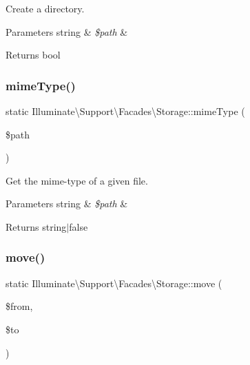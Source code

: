 Create a directory.


\begin{DoxyParams}[1]{Parameters}
string & {\em \$path} & \\
\hline
\end{DoxyParams}
\begin{DoxyReturn}{Returns}
bool 
\end{DoxyReturn}
\mbox{\label{class_illuminate_1_1_support_1_1_facades_1_1_storage_a85d3efe936f8fab53debba18b2c1ae89}} 
\subsubsection{\texorpdfstring{mime\+Type()}{mimeType()}}
{\footnotesize\ttfamily static Illuminate\textbackslash{}\+Support\textbackslash{}\+Facades\textbackslash{}\+Storage\+::mime\+Type (\begin{DoxyParamCaption}\item[{}]{\$path }\end{DoxyParamCaption})\hspace{0.3cm}{\ttfamily [static]}}

Get the mime-\/type of a given file.


\begin{DoxyParams}[1]{Parameters}
string & {\em \$path} & \\
\hline
\end{DoxyParams}
\begin{DoxyReturn}{Returns}
string$\vert$false 
\end{DoxyReturn}
\mbox{\label{class_illuminate_1_1_support_1_1_facades_1_1_storage_a4d66b8253e6f77937b0d0a66883b15c0}} 
\subsubsection{\texorpdfstring{move()}{move()}}
{\footnotesize\ttfamily static Illuminate\textbackslash{}\+Support\textbackslash{}\+Facades\textbackslash{}\+Storage\+::move (\begin{DoxyParamCaption}\item[{}]{\$from,  }\item[{}]{\$to }\end{DoxyParamCaption})\hspace{0.3cm}{\ttfamily [static]}}

